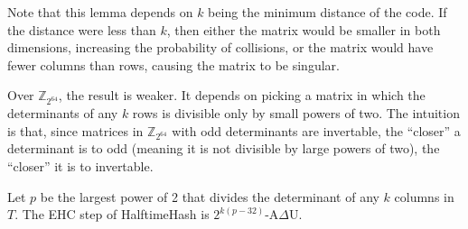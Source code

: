 \documentclass[runningheads]{llncs}
\newcommand{\ints}{\mathbb{Z}}
\begin{document}
Note that this lemma depends on $k$ being the minimum distance of the code.
If the distance were less than $k$, then either the matrix would be smaller in both dimensions, increasing the probability of collisions, or the matrix would have fewer columns than rows, causing the matrix to be singular.

Over $\ints_{2^{64}}$, the result is weaker.
It depends on picking a matrix in which the determinants of any $k$ rows is divisible only by small powers of two.
The intuition is that, since matrices in $\ints_{2^{64}}$ with odd determinants are invertable, the ``closer'' a determinant is to odd (meaning it is not divisible by large powers of two), the ``closer'' it is to invertable.

\begin{theorem}
  Let $p$ be the largest power of 2 that divides the determinant of any $k$ columns in $T$.
  The EHC step of HalftimeHash is $2^{k(p-32)}$-A$\Delta$U.
\end{theorem}
\end{document}
